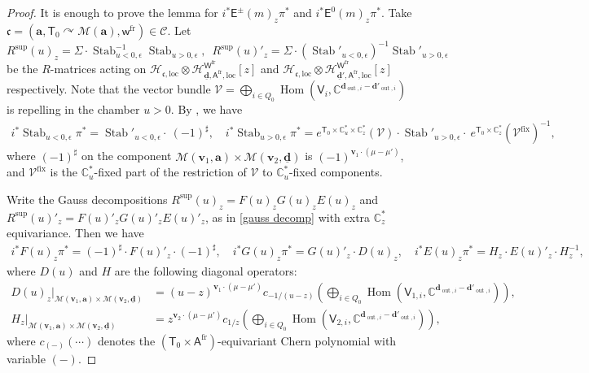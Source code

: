 \documentclass[10pt]{amsart}
\theoremstyle{definition}
\numberwithin{equation}{section}
\newcommand{\bC}{\mathbb{C}}
\newcommand{\ba}{\mathbf{a}}
\newcommand{\bv}{\mathbf{v}}
\newcommand{\bd}{\mathbf{d}}
\newcommand{\cH}{\mathcal{H}}
\newcommand{\cM}{\mathcal{M}}
\newcommand{\cV}{\mathcal{V}}
\newcommand{\loc}{\mathrm{loc}}
\newcommand{\sA}{\mathsf{A}}
\newcommand{\sT}{\mathsf{T}}
\newcommand{\sW}{\mathsf{W}}
\newcommand{\sw}{\mathsf{w}}
\newcommand{\Hom}{\operatorname{Hom}}
\newcommand{\Stab}{\operatorname{Stab}}
\newcommand{\Out}{\operatorname{out}}
\begin{document}
\begin{proof}
It is enough to prove the lemma for $i^*\mathsf E^\pm(m)_z\pi^*$ and $i^*\mathsf E^0(m)_z\pi^*$. Take $\mathfrak{c}=(\ba,\sT_0\curvearrowright\cM(\ba),\sw^{\mathrm{fr}})\in \mathcal C$. Let $$R^{\mathrm{sup}}(u)_z=\Sigma\cdot\Stab_{u<0,\epsilon}^{-1}\Stab_{u>0,\epsilon},\,\,\,R^{\mathrm{sup}}(u)'_z=\Sigma\cdot(\Stab'_{u<0,\epsilon})^{-1}\Stab'_{u>0,\epsilon}$$ be the $R$-matrices acting on $\cH_{\mathfrak{c},\loc}\otimes \cH^{\sW^{\mathrm{fr}}}_{\underline{\bd},\sA^{\mathrm{fr}},\loc}[z]$ and $\cH_{\mathfrak{c},\loc}\otimes \cH^{\sW^{\mathrm{fr}}}_{\underline{\bd}',\sA^{\mathrm{fr}},\loc}[z]$ respectively. Note that the vector bundle $\mathcal V=\bigoplus_{i\in Q_0}\Hom(\mathsf V_i,\bC^{\bd_{\Out,i}-\bd'_{\Out,i}})$ is repelling in the chamber $u>0$. By \cite[Props.~8.2,~8.3]{COZZ}, we have
\begin{align*}
i^*\Stab_{u<0,\epsilon}\pi^*=\Stab'_{u<0,\epsilon}\cdot \:(-1)^{\sharp},\quad i^*\Stab_{u>0,\epsilon}\pi^*=e^{\sT_0\times\bC^*_u\times \bC^*_z}(\mathcal V)\cdot\Stab'_{u>0,\epsilon}\cdot \:e^{\sT_0\times \bC^*_z}(\mathcal V^{\mathrm{fix}})^{-1},
\end{align*}
where $(-1)^{\sharp}$ on the component $\cM(\bv_1,\ba)\times \cM(\bv_2,\underline{\bd})$ is $(-1)^{\bv_1\cdot(\mu-\mu')}$, and $\mathcal V^{\mathrm{fix}}$ is the $\bC^*_u$-fixed part of the restriction of $\cV$ to $\bC^*_u$-fixed components.

Write the Gauss decompositions $R^{\mathrm{sup}}(u)_z=F(u)_zG(u)_zE(u)_z$ and $R^{\mathrm{sup}}(u)'_z=F(u)'_zG(u)'_zE(u)'_z$, as in \eqref{gauss decomp} with extra $\bC^*_z$ equivariance. Then we have
\begin{align*}
    i^*F(u)_z\pi^*=(-1)^{\sharp}\cdot F(u)'_z\cdot(-1)^{\sharp},\quad i^*G(u)_z\pi^*=G(u)'_z\cdot D(u)_z,\quad i^*E(u)_z\pi^*=H_z\cdot E(u)'_z\cdot H^{-1}_z,
\end{align*}
where $D(u)$ and $H$ are the following diagonal operators:
\begin{align*}
    D(u)_z\bigg|_{\cM(\bv_1,\ba)\times\cM(\bv_2,\underline{\bd})}&=(u-z)^{\bv_1\cdot(\mu-\mu')}c_{-1/(u-z)}\left(\bigoplus_{i\in Q_0}\Hom(\mathsf V_{1,i},\bC^{\bd_{\Out,i}-\bd'_{\Out,i}})\right),\\
    H_z\bigg|_{\cM(\bv_1,\ba)\times\cM(\bv_2,\underline{\bd})}&=z^{\bv_2\cdot(\mu-\mu')}c_{1/z}\left(\bigoplus_{i\in Q_0}\Hom(\mathsf V_{2,i},\bC^{\bd_{\Out,i}-\bd'_{\Out,i}})\right),
\end{align*}
where $c_{(-)}(\cdots)$ denotes the $(\sT_0\times \sA^{\text{fr}})$-equivariant Chern polynomial with variable $(-)$. 


\end{proof}
\end{document}
